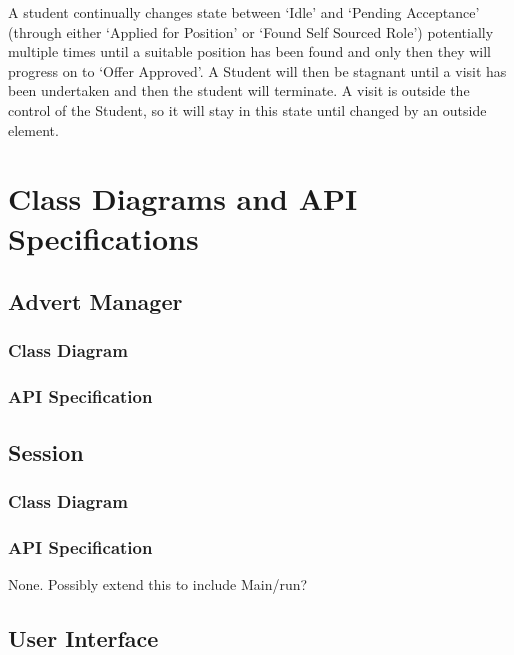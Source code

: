 \documentclass[11pt]{article}
\begin{document}
A student continually changes state between `Idle' and `Pending
Acceptance' (through either `Applied for Position' or `Found Self
Sourced Role') potentially multiple times until a suitable position
has been found and only then they will progress on to `Offer
Approved'. A Student will then be stagnant until a visit has been
undertaken and then the student will terminate. A visit is outside the
control of the Student, so it will stay in this state until changed by
an outside element.

\newpage

\section{Class Diagrams and API Specifications}

\subsection{Advert Manager}

\subsubsection{Class Diagram}

\subsubsection{API Specification}

\newpage

\subsection{Session}

\subsubsection{Class Diagram}

\subsubsection{API Specification}

None. Possibly extend this to include Main/run?

\newpage

\subsection{User Interface}
\end{document}
